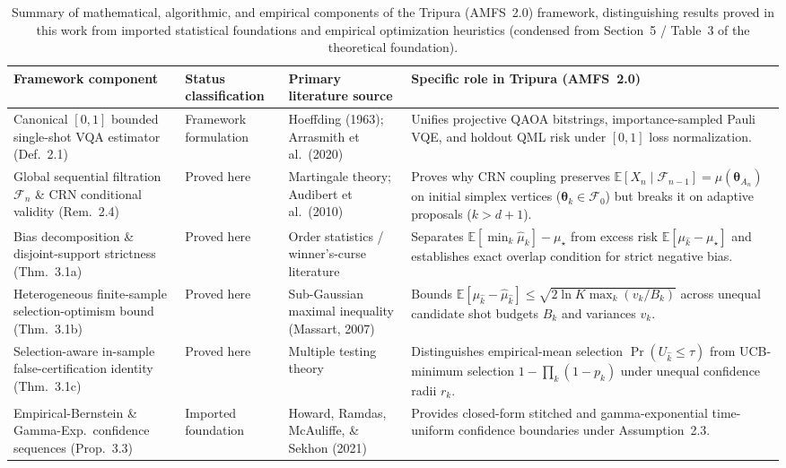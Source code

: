 \begin{table}[htbp]
\caption{Summary of mathematical, algorithmic, and empirical components of the Tripura (AMFS~2.0) framework, distinguishing results proved in this work from imported statistical foundations and empirical optimization heuristics (condensed from Section~5 / Table~3 of the theoretical foundation).}
\label{tab:contributions}
\centering
\footnotesize
\begin{tabular}{@{}p{4.3cm} p{3.1cm} p{4.2cm} p{5.4cm}@{}}
\toprule
Framework component & Status classification & Primary literature source & Specific role in Tripura (AMFS~2.0) \\
\midrule
Canonical $[0,1]$ bounded single-shot VQA estimator (Def.~2.1) & Framework formulation & Hoeffding (1963); Arrasmith et al.\ (2020) & Unifies projective QAOA bitstrings, importance-sampled Pauli VQE, and holdout QML risk under $[0,1]$ loss normalization. \\
Global sequential filtration $\mathcal{F}_n$ \& CRN conditional validity (Rem.~2.4) & Proved here & Martingale theory; Audibert et al.\ (2010) & Proves why CRN coupling preserves $\mathbb{E}[X_n\mid\mathcal{F}_{n-1}]=\mu(\bm{\theta}_{A_n})$ on initial simplex vertices ($\bm{\theta}_k\in\mathcal{F}_0$) but breaks it on adaptive proposals ($k>d+1$). \\
Bias decomposition \& disjoint-support strictness (Thm.~3.1a) & Proved here & Order statistics / winner's-curse literature & Separates $\mathbb{E}[\min_k\hat{\mu}_k]-\mu_\star$ from excess risk $\mathbb{E}[\mu_{\hat{k}}-\mu_\star]$ and establishes exact overlap condition for strict negative bias. \\
Heterogeneous finite-sample selection-optimism bound (Thm.~3.1b) & Proved here & Sub-Gaussian maximal inequality (Massart, 2007) & Bounds $\mathbb{E}[\mu_{\hat{k}}-\hat{\mu}_{\hat{k}}] \le \sqrt{2\ln K\max_k(v_k/B_k)}$ across unequal candidate shot budgets $B_k$ and variances $v_k$. \\
Selection-aware in-sample false-certification identity (Thm.~3.1c) & Proved here & Multiple testing theory & Distinguishes empirical-mean selection $\Pr(U_{\hat{k}}\le\tau)$ from UCB-minimum selection $1-\prod_k(1-p_k)$ under unequal confidence radii $r_k$. \\
Empirical-Bernstein \& Gamma-Exp.\ confidence sequences (Prop.~3.3) & Imported foundation & Howard, Ramdas, McAuliffe, \& Sekhon (2021) & Provides closed-form stitched and gamma-exponential time-uniform confidence boundaries under Assumption~2.3. \\

\end{tabular}
\end{table}
